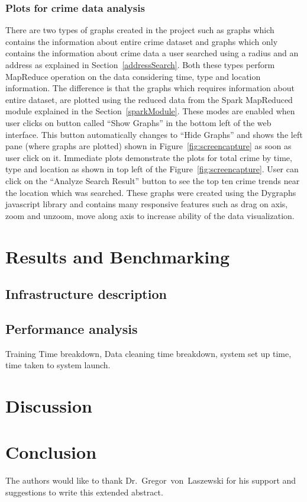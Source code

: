 \subsubsection{Plots for crime data analysis}\label{plottingData}
There are two types of graphs created in the project such as graphs
which contains the information about entire crime dataset and graphs
which only contains the information about crime data a user searched
using a radius and an address as explained in
Section~\ref{addressSearch}. Both these types perform MapReduce
operation on the data considering time, type and location
information. The difference is that the graphs which requires
information about entire dataset, are plotted using the reduced data
from the Spark MapReduced module explained in the
Section~\ref{sparkModule}. These modes are enabled when user clicks on
button called ``Show Graphs'' in the bottom left of the web
interface. This button automatically changes to ``Hide Graphs'' and
shows the left pane (where graphs are plotted) shown in
Figure~\ref{fig:screencapture} as soon as user click on it. Immediate
plots demonstrate the plots for total crime by time, type and location
as shown in top left of the Figure~\ref{fig:screencapture}. User can
click on the ``Analyze Search Result'' button to see the top ten crime
trends near the location which was searched. These graphs were created
using the Dygraphs javascript library and contains many responsive
features such as drag on axis, zoom and unzoom, move along axis to
increase ability of the data visualization.

\section{Results and Benchmarking}

\subsection{Infrastructure description}

\subsection{Performance analysis}
Training Time breakdown, 
Data cleaning time breakdown, 
system set up time, 
time taken to system launch.

\section{Discussion} 

\section{Conclusion} 

\begin{acks}
	
The authors would like to thank Dr.~Gregor~von~Laszewski for his
support and suggestions to write this extended abstract.
	
\end{acks}


 
